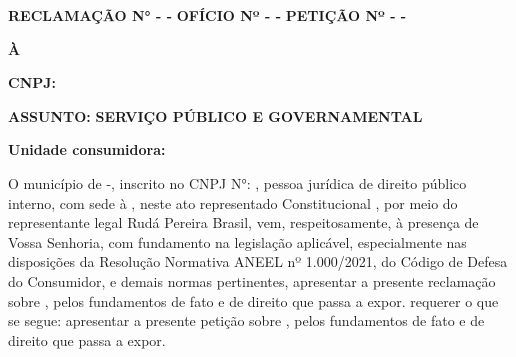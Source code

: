 \ifnum{}
\textbf{RECLAMAÇÃO N° \numReclamacao{} - \nomeMunicipio{} - \siglaEstado{}}
\else
\ifnum{}
\textbf{OFÍCIO Nº \numReclamacao{} - \nomeMunicipio{} - \siglaEstado{}}
\else
\textbf{PETIÇÃO Nº \numReclamacao{} - \nomeMunicipio{} - \siglaEstado{}}
\fi
\fi

\textbf{À \nomeConcessionaria{}}

\textbf{CNPJ: \cnpjConcessionaria{}}

\ifnum{}
\textbf{ASSUNTO: \tituloDocumento{}}
\else
\textbf{SERVIÇO PÚBLICO E GOVERNAMENTAL}
\fi

\ifnum{}
\textbf{Unidade consumidora: \unidadeConsumidora{}}
\fi

\vspace{0,25cm}

O município de \nomeMunicipio{}-\siglaEstado{}, inscrito no CNPJ N°: \cnpjMunicipio{}, pessoa jurídica de direito público interno, com sede à \sedePrefeitura{}, neste ato representado \generoPrefeitura{} Constitucional \nomePrefeito{}, por meio do representante legal Rudá Pereira Brasil, vem, respeitosamente, à presença de Vossa Senhoria, com fundamento na legislação aplicável, especialmente nas disposições da Resolução Normativa ANEEL nº 1.000/2021, do Código de Defesa do Consumidor, e demais normas pertinentes,
\ifnum{}
apresentar a presente reclamação sobre \tituloDocumento{}, pelos fundamentos de fato e de direito que passa a expor.
\else
\ifnum{}
requerer o que se segue:
\else
apresentar a presente petição sobre \tituloDocumento{}, pelos fundamentos de fato e de direito que passa a expor.
\fi
\fi
